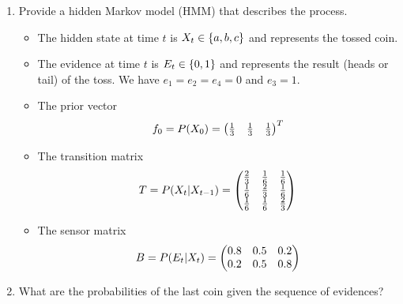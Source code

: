 \documentclass[11pt, a4paper]{article}
\begin{document}
\begin{enumerate}
    \item Provide a hidden Markov model (HMM) that describes the process.
    
    \begin{solution}
        \begin{itemize}
            \item The hidden state at time $t$ is $X_t \in \{a, b, c\}$ and represents the tossed coin.
            
            \item The evidence at time $t$ is $E_t \in \{0, 1\}$ and represents the result (heads or tail) of the toss. We have $e_1 = e_2 = e_4 = 0$ and $e_3 = 1$.
            
            \item The prior vector
                \begin{equation*}
                    f_0 = P(X_0) = \begin{pmatrix}\frac{1}{3} & \frac{1}{3} & \frac{1}{3}\end{pmatrix}^T
                \end{equation*}
                
            \item The transition matrix
                \begin{equation*}
                    T = P(X_t \vert X_{t-1}) = \begin{pmatrix}
                        \frac{2}{3} & \frac{1}{6} & \frac{1}{6} \\
                        \frac{1}{6} & \frac{2}{3} & \frac{1}{6} \\
                        \frac{1}{6} & \frac{1}{6} & \frac{2}{3}
                    \end{pmatrix}
                \end{equation*}
            
            \item The sensor matrix
                \begin{equation*}
                    B = P(E_t \vert X_t) = \begin{pmatrix}
                        0.8 & 0.5 & 0.2 \\
                        0.2 & 0.5 & 0.8
                    \end{pmatrix}
                \end{equation*}
        \end{itemize}
    \end{solution}
    
    \item What are the probabilities of the last coin given the sequence of evidences?
    

\end{enumerate}
\end{document}
